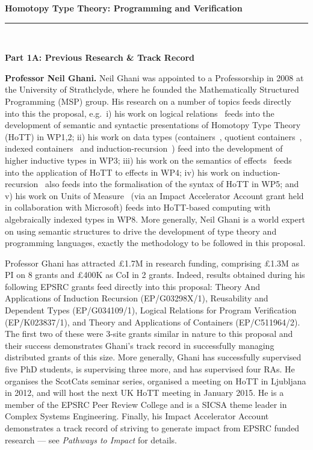 \documentclass[a4paper,11pt]{article}
\newcommand{\eg}{{e.g.}\ }
\begin{document}
\thispagestyle{plain}
\begin{center}
  {\Large {\bf Homotopy Type Theory: Programming and Verification}}\\[1ex] 
\vspace*{-0.1in}

  \rule{140mm}{.5mm}\\[2ex]
\end{center}

\noindent
{\bf \Large Part 1A: Previous Research \& Track Record}

\textbf{Professor Neil Ghani.} Neil Ghani was appointed to a
Professorship in 2008 at the University of Strathclyde, where he
founded the Mathematically Structured Programming (MSP) group. His
research on a number of topics feeds directly into this the proposal,
\eg i) his work on logical relations~\cite{neil2014relParamDep} feeds
into the development of semantic and syntactic presentations of
Homotopy Type Theory (HoTT) in WP1,2; ii) his work on data types
(containers~\cite{alti:cont-tcs}, quotient
containers~\cite{alti:mpc04}, indexed
containers~\cite{altenkirchGhaniHancockMcBrideMorris:indexedContainers}
and induction-recursion~\cite{ghani:fibredIR}) feed into the
development of higher inductive types in WP3; iii) his work on the
semantics of effects~\cite{atkeyGhaniJacobsJohann:effects} feeds into
the application of HoTT to effects in WP4; iv) his work on
induction-recursion~\cite{ghani:fibredIR} also feeds into the
formalisation of the syntax of HoTT in WP5; and v) his work on Units
of Measure~\cite{uom} (via an Impact Accelerator Account grant held in
collaboration with Microsoft) feeds into HoTT-based computing with
algebraically indexed types in WP8. More generally, Neil Ghani is a
world expert on using semantic structures to drive the development of
type theory and programming languages, exactly the methodology to be
followed in this proposal.

Professor Ghani has attracted \pounds 1.7M in research funding,
comprising \pounds 1.3M as PI on 8 grants and \pounds 400K as CoI in 2
grants.  Indeed, results obtained during his following EPSRC grants
feed directly into this proposal: Theory And Applications of Induction
Recursion (EP/G03298X/1), Reusability and Dependent Types
(EP/G034109/1), Logical Relations for Program Verification
(EP/K023837/1), and Theory and Applications of Containers
(EP/C511964/2). The first two of these were 3-site grants similar in
nature to this proposal and their success demonstrates Ghani's track
record in successfully managing distributed grants of this size. More
generally, Ghani has successfully supervised five PhD students, is
supervising three more, and has supervised four RAs. He organises the
ScotCats seminar series, organised a meeting on HoTT in Ljubljana in
2012, and will host the next UK HoTT meeting in January 2015. He is a
member of the EPSRC Peer Review College and is a SICSA theme leader in
Complex Systems Engineering. Finally, his Impact Accelerator Account
demonstrates a track record of striving to generate impact from EPSRC
funded research --- see {\em Pathways to Impact} for details.
\end{document}
